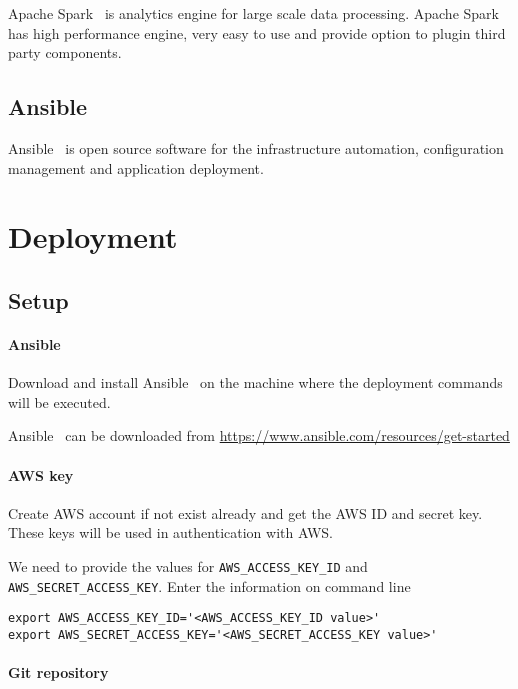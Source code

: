 Apache Spark~\cite{hid-sp18-511-www-spark} is analytics engine for
large scale data processing. Apache
Spark~\cite{hid-sp18-511-www-spark} has high performance engine, very
easy to use and provide option to plugin third party components.

\subsection{Ansible}

Ansible~\cite{hid-sp18-511-www-ansible} is open source software for
the infrastructure automation, configuration management and
application deployment.

\section{Deployment}

\subsection{Setup}

\paragraph{Ansible}
Download and install Ansible~\cite{hid-sp18-511-www-ansible} on the
machine where the deployment commands will be executed.

Ansible~\cite{hid-sp18-511-www-ansible} can be downloaded from 
\url{https://www.ansible.com/resources/get-started}

\paragraph{AWS key}

Create AWS account if not exist already and get the AWS ID and secret
key. These keys will be used in authentication with AWS.

We need to provide the values for \verb|AWS_ACCESS_KEY_ID|
and \verb|AWS_SECRET_ACCESS_KEY|. Enter the information on command line

\begin{verbatim}
export AWS_ACCESS_KEY_ID='<AWS_ACCESS_KEY_ID value>'
export AWS_SECRET_ACCESS_KEY='<AWS_SECRET_ACCESS_KEY value>'
\end{verbatim}

\paragraph{Git repository}


